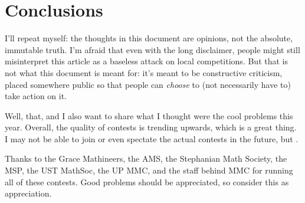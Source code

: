 \documentclass[11pt,paper=letter]{scrartcl}
\begin{document}
\section{Conclusions}

I'll repeat myself: the thoughts in this document are opinions, not the absolute, immutable truth. I'm afraid that even with the long disclaimer, people might still misinterpret this article as a baseless attack on local competitions. But that is not what this document is meant for: it's meant to be constructive criticism, placed somewhere public so that people can \emph{choose} to (not necessarily have to) take action on it.

Well, that, and I also want to share what I thought were the cool problems this year. Overall, the quality of contests is trending upwards, which is a great thing. I may not be able to join or even spectate the actual contests in the future, but .

Thanks to the Grace Mathineers, the AMS, the Stephanian Math Society, the MSP, the UST MathSoc, the UP MMC, and the staff behind MMC for running all of these contests. Good problems should be appreciated, so consider this as appreciation.
\end{document}
